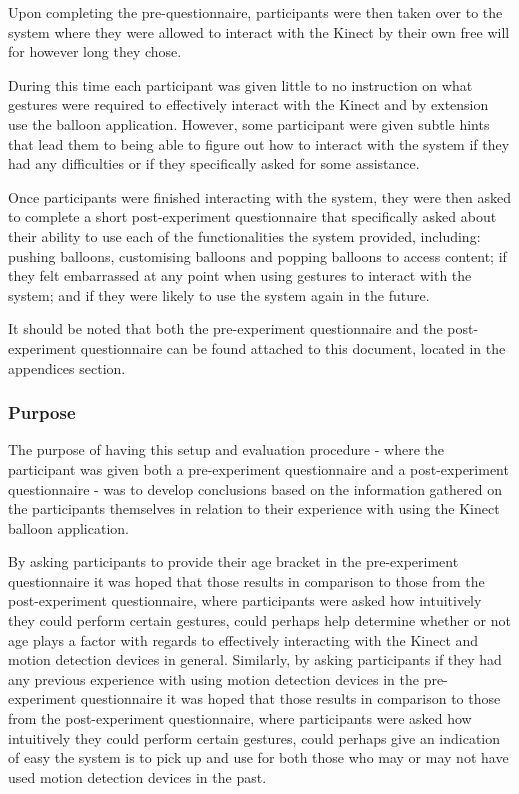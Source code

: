 Upon completing the pre-questionnaire, participants were then taken over to the system where they were allowed to interact with the Kinect by their own free will for however long they chose.

During this time each participant was given little to no instruction on what gestures were required to effectively interact with the Kinect and by extension use the balloon application. However, some participant were given subtle hints that lead them to being able to figure out how to interact with the system if they had any difficulties or if they specifically asked for some assistance.

Once participants were finished interacting with the system, they were then asked to complete a short post-experiment questionnaire that specifically asked about their ability to use each of the functionalities the system provided, including: pushing balloons, customising balloons and popping balloons to access content; if they felt embarrassed at any point when using gestures to interact with the system; and if they were likely to use the system again in the future.

It should be noted that both the pre-experiment questionnaire and the post-experiment questionnaire can be found attached to this document, located in the appendices section.

\subsubsection{Purpose}
The purpose of having this setup and evaluation procedure - where the participant was given both a pre-experiment questionnaire and a post-experiment questionnaire - was to develop conclusions based on the information gathered on the participants themselves in relation to their experience with using the Kinect balloon application.

By asking participants to provide their age bracket in the pre-experiment questionnaire it was hoped that those results in comparison to those from the post-experiment questionnaire, where participants were asked how intuitively they could perform certain gestures, could perhaps help determine whether or not age plays a factor with regards to effectively interacting with the Kinect and motion detection devices in general. Similarly, by asking participants if they had any previous experience with using motion detection devices in the pre-experiment questionnaire it was hoped that those results in comparison to those from the post-experiment questionnaire, where participants were asked how intuitively they could perform certain gestures, could perhaps give an indication of easy the system is to pick up and use for both those who may or may not have used motion detection devices in the past. 

